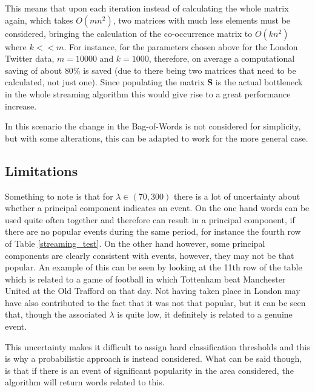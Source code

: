 \documentclass[11pt,a4paper]{article}
\newcommand{\smat}{\mathbf{S}}
\begin{document}
This means that upon each iteration instead of calculating the whole matrix again, which takes $O(mn^2)$, two matrices with much less elements must be considered, bringing the calculation of the co-occurrence matrix to $O(kn^2)$ where $k << m$. For instance, for the parameters chosen above for the London Twitter data, $m = 10000$ and $k = 1000$, therefore, on average a computational saving of about $80\%$ is saved (due to there being two matrices that need to be calculated, not just one). Since populating the matrix $\smat$ is the actual bottleneck in the whole streaming algorithm this would give rise to a great performance increase. 

In this scenario the change in the Bag-of-Words is not considered for simplicity, but with some alterations, this can be adapted to work for the more general case.


\subsection{Limitations}

Something to note is that for $\lambda \in (70, 300) $ there is a lot of uncertainty about whether a principal component indicates an event. On the one hand words can be used quite often together and therefore can result in a principal component, if there are no popular events during the same period, for instance the fourth row of Table \ref{streaming_test}. On the other hand however, some principal components are clearly consistent with events, however, they may not be that popular. An example of this can be seen by looking at the 11th row of the table which is related to a game of football in which Tottenham beat Manchester United at the Old Trafford on that day. Not having taken place in London may have also contributed to the fact that it was not that popular, but it can be seen that, though the associated $\lambda$ is quite low, it definitely is related to a genuine event. 

This uncertainty makes it difficult to assign hard classification thresholds and this is why a probabilistic approach is instead considered. What can be said though, is that if there is an event of significant popularity in the area considered, the algorithm will return words related to this.
\end{document}
